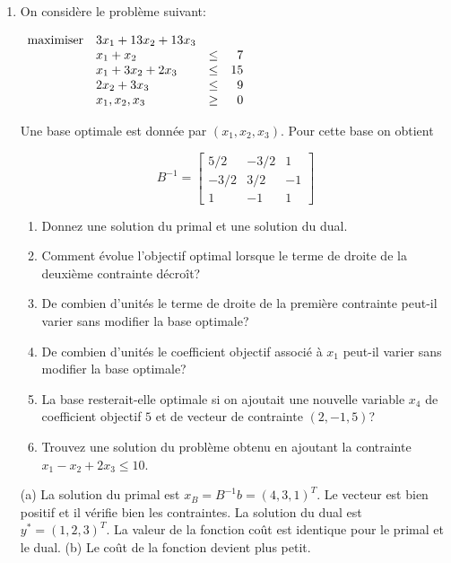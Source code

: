 \begin{enumerate}
  \item On considère le problème suivant:

    $
    \begin{array}{llcr}
      \mbox{maximiser} & 3x_1+13x_2+13x_3\\
      & x_1+x_2 & \leq & 7\\
      & x_1+ 3x_2+ 2x_3 & \leq & 15\\
      &  2x_2+ 3x_3 & \leq & 9\\
      & x_1, x_2, x_3 & \geq & 0
    \end{array}
    $

    Une base optimale est donnée par $(x_1, x_2, x_3)$. Pour cette base on obtient

    $$
    B^{-1}=
    \left[
      \begin{array}{ccc}
        5/2 & -3/2 & 1\\
        -3/2 & 3/2 & -1\\
        1 & -1 & 1
      \end{array}
    \right]
    $$

    \begin{enumerate}
      \item Donnez une solution du primal et une solution du dual.
      \item Comment évolue l'objectif optimal lorsque le terme de droite de la deuxième contrainte décroît?
      \item De combien d'unités le terme de droite de la première contrainte peut-il varier sans modifier la base optimale?
      \item De combien d'unités le coefficient objectif associé à $x_1$ peut-il varier sans modifier la base
        optimale?
      \item La base resterait-elle optimale si on ajoutait une nouvelle variable $x_4$ de coefficient objectif $5$ et de vecteur de contrainte $(2, -1, 5)$?
      \item Trouvez une solution du problème obtenu en ajoutant la contrainte $x_1-x_2+2x_3 \leq 10$.

    \end{enumerate}


    \begin{solution}
      (a) La solution du primal est $x_{B} = B^{-1}b = (4,3,1)^{T}$. Le vecteur est bien positif et il vérifie bien les contraintes. La solution du dual est $y^{*} = (1,2,3)^{T}$. La valeur de la fonction coût est identique pour le primal et le dual.
      (b) Le coût de la fonction devient plus petit.
    \end{solution}


\end{enumerate}
